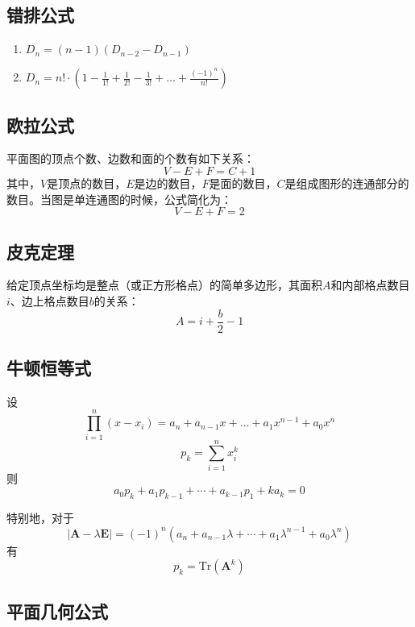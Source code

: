 \subsection{错排公式}
	\begin{enumerate}
		\item $D_n = (n-1)(D_{n-2}-D_{n-1})$
		\item $D_n = n! \cdot (1-\frac{1}{1!}+\frac{1}{2!}-\frac{1}{3!}+\ldots+\frac{(-1)^n}{n!})$
	\end{enumerate}
\subsection{欧拉公式}
	平面图的顶点个数、边数和面的个数有如下关系：
		$$V - E + F = C+ 1$$
	\indent 其中，$V$是顶点的数目，$E$是边的数目，$F$是面的数目，$C$是组成图形的连通部分的数目。当图是单连通图的时候，公式简化为：
		$$V - E + F = 2$$
\subsection{皮克定理}
	给定顶点坐标均是整点（或正方形格点）的简单多边形，其面积$A$和内部格点数目$i$、边上格点数目$b$的关系：
		$$A = i + \frac{b}{2} - 1$$
\subsection{牛顿恒等式}
	设$$\prod_{i = 1}^n{(x - x_i)} = a_n + a_{n - 1} x + \dots + a_1 x^{n - 1} + a_0 x^n$$
	$$p_k = \sum_{i = 1}^n{x_i^k}$$
	则$$a_0 p_k + a_1 p_{k - 1} + \cdots + a_{k - 1} p_1 + k a_k = 0$$\par
	特别地，对于$$|\bm{A} - \lambda \bm{E}| = (-1)^n(a_n + a_{n - 1} \lambda + \cdots + a_1 \lambda^{n - 1} + a_0 \lambda^n)$$
	有$$p_k = \mathrm{Tr}(\bm{A}^k)$$
\subsection{平面几何公式}
